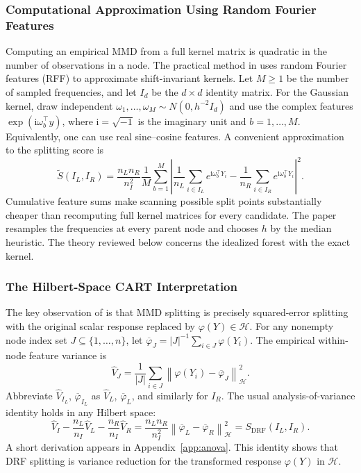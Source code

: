 \documentclass[12pt,a4paper]{article}
\newcommand{\calH}{\mathcal H}
\newcommand{\1}{\mathbf 1}
\newcommand{\norm}[1]{\left\lVert#1\right\rVert}
\begin{document}
\subsubsection{Computational Approximation Using Random Fourier Features}
Computing an empirical MMD from a full kernel matrix is quadratic in the number of observations in a node. The practical method in \cite{cevid2022} uses random Fourier features (RFF) to approximate shift-invariant kernels. Let $M\ge1$ be the number of sampled frequencies, and let $I_d$ be the $d\times d$ identity matrix. For the Gaussian kernel, draw independent $\omega_1,\ldots,\omega_M\sim N(0,h^{-2}I_d)$ and use the complex features $\exp(\mathrm{i}\omega_b^\top y)$, where $\mathrm{i}=\sqrt{-1}$ is the imaginary unit and $b=1,\ldots,M$. Equivalently, one can use real sine--cosine features. A convenient approximation to the splitting score is
\begin{equation}\label{eq:rffscore}
 \widetilde S(I_L,I_R)=\frac{n_Ln_R}{n_I^2}\frac{1}{M}\sum_{b=1}^{M}
 \left|\frac1{n_L}\sum_{i\in I_L}e^{\mathrm{i}\omega_b^\top Y_i}
       -\frac1{n_R}\sum_{i\in I_R}e^{\mathrm{i}\omega_b^\top Y_i}\right|^2.
\end{equation}
Cumulative feature sums make scanning possible split points substantially cheaper than recomputing full kernel matrices for every candidate. The paper resamples the frequencies at every parent node and chooses $h$ by the median heuristic. The theory reviewed below concerns the idealized forest with the exact kernel.

\subsubsection{The Hilbert-Space CART Interpretation}
The key observation of \cite[Theorem~1]{cevid2022} is that MMD splitting is precisely squared-error splitting with the original scalar response replaced by $\varphi(Y)\in\calH$. For any nonempty node index set $J\subseteq\{1,\ldots,n\}$, let $\overline\varphi_J=|J|^{-1}\sum_{i\in J}\varphi(Y_i)$. The empirical within-node feature variance is
\[
 \widehat V_J=\frac1{|J|}\sum_{i\in J}\norm{\varphi(Y_i)-\overline\varphi_J}_{\calH}^2.
\]
Abbreviate $\widehat V_{I_L}$, $\overline\varphi_{I_L}$ as $\widehat V_L$, $\overline\varphi_L$, and similarly for $I_R$. The usual analysis-of-variance identity holds in any Hilbert space:
\begin{equation}\label{eq:anova}
 \widehat V_I-\frac{n_L}{n_I}\widehat V_L-\frac{n_R}{n_I}\widehat V_R
 =\frac{n_Ln_R}{n_I^2}\norm{\overline\varphi_L-\overline\varphi_R}_{\calH}^2
 =S_{\mathrm{DRF}}(I_L,I_R).
\end{equation}
A short derivation appears in Appendix~\ref{app:anova}. This identity shows that DRF splitting is variance reduction for the transformed response $\varphi(Y)$ in $\calH$.
\end{document}
